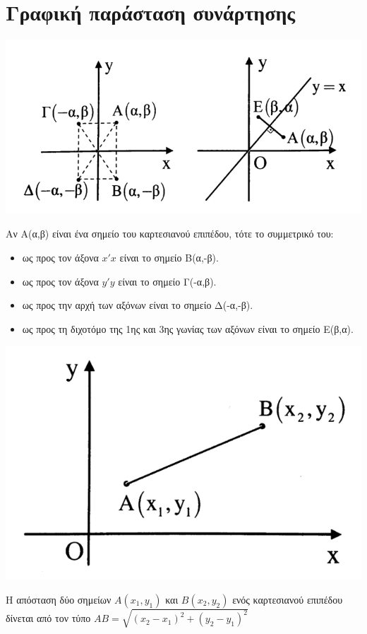 \documentclass[11pt, a4paper, twoside, fleqn]{article}
\begin{document}
\section{Γραφική παράσταση συνάρτησης}
\includegraphics[scale=0.55]{Grafiki_Parastasi}
\begin{flushleft}
Αν Α(α,β) είναι ένα σημείο του καρτεσιανού επιπέδου, τότε το συμμετρικό του:
\end{flushleft}
\begin{itemize}[itemsep=0ex, leftmargin=*]
\item ως προς τον άξονα \(x'x\) είναι το σημείο B(α,-β).
\item ως προς τον άξονα \(y'y\) είναι το σημείο Γ(-α,β).
\item ως προς την αρχή των αξόνων είναι το σημείο Δ(-α,-β).
\item ως προς τη διχοτόμο της 1ης και 3ης γωνίας των αξόνων είναι το σημείο Ε(β,α).
\end{itemize}
\includegraphics[scale=0.35]{Apostasi}
\begin{flushleft}
Η απόσταση δύο σημείων \(Α(x_{1}, y_{1})\) και \(B(x_{2}, y_{2})\) ενός καρτεσιανού επιπέδου δίνεται από τον τύπο \(AB = \sqrt{(x_{2}-x_{1})^{2} + (y_{2}-y_{1})^{2}}\)
\end{flushleft}
\end{document}
